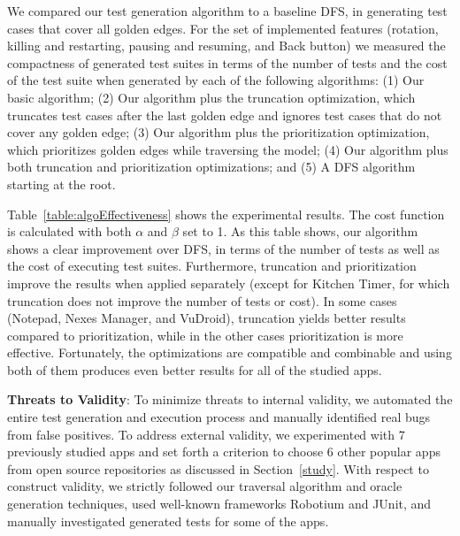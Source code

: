 We compared our test generation algorithm to a baseline DFS, in generating test cases that cover all golden edges. For the set of implemented features (rotation, killing and restarting, pausing and resuming, and Back button) we measured the compactness of generated test suites in terms of the number of tests and the cost of the test suite when generated by each of the following algorithms:
(1) Our basic algorithm;
(2) Our algorithm plus the truncation optimization, which truncates test cases after the last golden edge and ignores test cases that do not cover any golden edge;
(3) Our algorithm plus the prioritization optimization, which prioritizes golden edges while traversing the model;
(4) Our algorithm plus both truncation and prioritization optimizations; and
(5) A DFS algorithm starting at the root.

Table~\ref{table:algoEffectiveness} shows the experimental results. The cost function is calculated with both $\alpha$ and $\beta$ set to 1. As this table shows, our algorithm shows a clear improvement over DFS, in terms of the number of tests as well as the cost of executing test suites. Furthermore, truncation and prioritization improve the results when applied separately (except for Kitchen Timer, for which truncation does not improve the number of tests or cost). In some cases (Notepad, Nexes Manager, and VuDroid), truncation yields better results compared to prioritization, while in the other cases prioritization is more effective. Fortunately, the optimizations are compatible and combinable and using both of them produces even better results for all of the studied apps.



{\bf Threats to Validity}: To minimize threats to internal validity, we automated the entire test generation and execution process and manually identified real bugs from false positives. To address external validity, we experimented with 7 previously studied apps and set forth a criterion to choose 6 other popular apps from open source repositories as discussed in Section~\ref{study}. With respect to construct validity, we strictly followed our traversal algorithm and oracle generation techniques, used well-known frameworks Robotium and JUnit, and manually investigated generated tests for some of the apps. 

